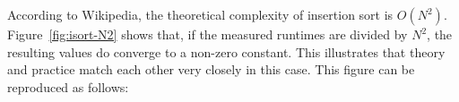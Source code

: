 \documentclass[a4paper,10pt]{article}
\begin{document}
\small\noindent

\normalsize

According to Wikipedia, the theoretical complexity of insertion sort is $O(N^2)$.
Figure~\ref{fig:isort-N2} shows that, if the measured runtimes are divided by $N^2$, the resulting values do converge to a non-zero constant.
This illustrates that theory and practice match each other very closely in this case.
This figure can be reproduced as follows:

\small\noindent

\normalsize
\end{document}
